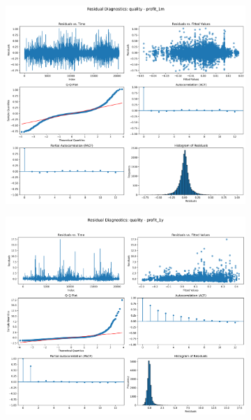 \documentclass[11pt,english,a4paper,hidelinks]{book}
\begin{document}
\begin{figure}[H]
    \centering
    \begin{subfigure}[b]{0.32\textwidth}
        \centering
        \includegraphics[width=\textwidth]{images/code/models/linear_regression/first_model/USA/quality_profit_1m_residuals.png}
    \end{subfigure}
    \hfill
    \begin{subfigure}[b]{0.32\textwidth}
        \centering
        \includegraphics[width=\textwidth]{images/code/models/linear_regression/first_model/USA/quality_profit_1y_residuals.png}

\end{subfigure}
\end{figure}
\end{document}
